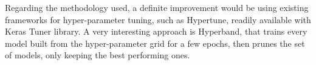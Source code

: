 Regarding the methodology used, a definite improvement would be using existing
frameworks for hyper-parameter tuning, such as Hypertune, readily available
with Keras Tuner library. A very interesting approach is Hyperband, that trains
every model built from the hyper-parameter grid for a few epochs, then prunes
the set of models, only keeping the best performing ones.


